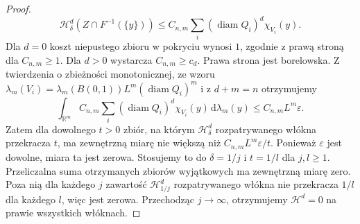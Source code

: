 \begin{proof}
\[
 \mathcal H^d_\delta(Z\cap F^{-1}(\{y\}))
 \le C_{n,m}\sum_i(\operatorname{diam}Q_i)^d\chi_{V_i}(y).
\]
Dla $d=0$ koszt niepustego zbioru w pokryciu
wynosi $1$, zgodnie z prawą stroną dla $C_{n,m}\ge1$.
Dla $d>0$ wystarcza $C_{n,m}\ge c_d$.
Prawa strona jest borelowska. Z twierdzenia
o zbieżności monotonicznej, ze wzoru
$\lambda_m(V_i)=\lambda_m(B(0,1))L^m
(\operatorname{diam}Q_i)^m$ i z $d+m=n$ otrzymujemy
\[
 \int_{\mathbb R^m}C_{n,m}\sum_i
 (\operatorname{diam}Q_i)^d\chi_{V_i}(y)
 \,\mathrm d\lambda_m(y)
 \le C_{n,m}L^m\varepsilon.
\]
Zatem dla dowolnego $t>0$ zbiór, na którym
$\mathcal H^d_\delta$ rozpatrywanego włókna
przekracza $t$, ma zewnętrzną miarę nie większą
niż $C_{n,m}L^m\varepsilon/t$. Ponieważ
$\varepsilon$ jest dowolne, miara ta jest zerowa.
Stosujemy to do $\delta=1/j$ i $t=1/l$ dla
$j,l\ge1$. Przeliczalna suma otrzymanych zbiorów
wyjątkowych ma zewnętrzną miarę zero. Poza nią
dla każdego $j$ zawartość $\mathcal H^d_{1/j}$
rozpatrywanego włókna nie przekracza $1/l$ dla
każdego $l$, więc jest zerowa. Przechodząc
$j\to\infty$, otrzymujemy $\mathcal H^d=0$
na prawie wszystkich włóknach.
\end{proof}

